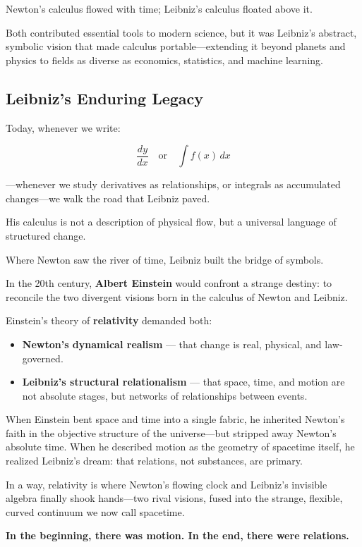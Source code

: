 Newton’s calculus flowed with time; Leibniz’s calculus floated above it.

Both contributed essential tools to modern science, but it was Leibniz’s abstract, symbolic vision that made calculus portable—extending it beyond planets and physics to fields as diverse as economics, statistics, and machine learning.

\subsection{Leibniz’s Enduring Legacy}

Today, whenever we write:

\[
\frac{dy}{dx}
\quad \text{or} \quad
\int f(x)\,dx
\]

—whenever we study derivatives as relationships, or integrals as accumulated changes—we walk the road that Leibniz paved.

His calculus is not a description of physical flow, but a universal language of structured change.

Where Newton saw the river of time, Leibniz built the bridge of symbols.

\begin{tcolorbox}[colback=gray!5!white, colframe=black, title=\textbf{Philosophical Footnote: Einstein and the Reunion of Newton and Leibniz}, fonttitle=\bfseries, arc=1.5mm, boxrule=0.4pt]

  In the 20th century, \textbf{Albert Einstein} would confront a strange destiny: to reconcile the two divergent visions born in the calculus of Newton and Leibniz.

  \medskip
  
  Einstein’s theory of \textbf{relativity} demanded both:

  \medskip
  
  \begin{itemize}
      \item \textbf{Newton’s dynamical realism} — that change is real, physical, and law-governed.
      \item \textbf{Leibniz’s structural relationalism} — that space, time, and motion are not absolute stages, but networks of relationships between events.
  \end{itemize}

  \medskip
  
  When Einstein bent space and time into a single fabric, he inherited Newton’s faith in the objective structure of the universe—but stripped away Newton’s absolute time.  When he described motion as the geometry of spacetime itself, he realized Leibniz’s dream: that relations, not substances, are primary.
  
  \medskip
  
  In a way, relativity is where Newton’s flowing clock and Leibniz’s invisible algebra finally shook hands—two rival visions, fused into the strange, flexible, curved continuum we now call spacetime.
  
  \medskip
  
  \textbf{In the beginning, there was motion. In the end, there were relations.}

\end{tcolorbox}

